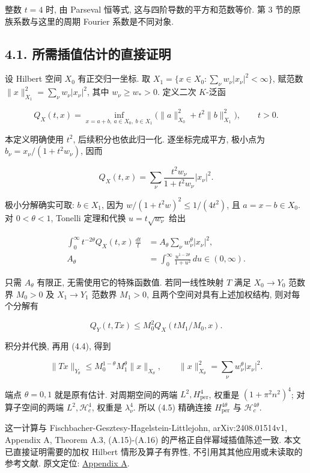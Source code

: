\documentclass[UTF8,fontset=fandol,11pt,a4paper]{ctexart}
\begin{document}
整数 \(t=4\) 时, 由 Parseval 恒等式, 这与四阶导数的平方和范数等价. 第 3 节的原族系数与这里的周期 Fourier 系数是不同对象.


\subsection*{4.1. 所需插值估计的直接证明}

设 Hilbert 空间 \(X_0\) 有正交归一坐标. 取
\(X_1=\{x\in X_0:\sum_\nu w_\nu|x_\nu|^2<\infty\}\),
赋范数 \(\|x\|_{X_1}^2=\sum_\nu w_\nu|x_\nu|^2\), 其中 \(w_\nu\ge w_*>0\).
定义二次 \(K\)-泛函


\[
 Q_X(t,x)=\inf_{x=a+b,\ a\in X_0,\ b\in X_1}
       \bigl(\|a\|_{X_0}^2+t^2\|b\|_{X_1}^2\bigr),\qquad t>0.
 \tag{4.2}
\]


本定义明确使用 \(t^2\), 后续积分也依此归一化. 逐坐标完成平方, 极小点为
\(b_\nu=x_\nu/(1+t^2w_\nu)\), 因而


\[
 Q_X(t,x)=\sum_\nu\frac{t^2w_\nu}{1+t^2w_\nu}|x_\nu|^2.
 \tag{4.3}
\]


极小分解确实可取: \(b\in X_1\), 因为
\(w/(1+t^2w)^2\le1/(4t^2)\), 且 \(a=x-b\in X_0\).
对 \(0<\theta<1\), Tonelli 定理和代换 \(u=t\sqrt{w_\nu}\) 给出


\[
 \begin{split}
 \int_0^\infty t^{-2\theta}Q_X(t,x)\,\frac{dt}{t}
 &=A_\theta\sum_\nu w_\nu^\theta|x_\nu|^2,\\
 A_\theta&=\int_0^\infty\frac{u^{1-2\theta}}{1+u^2}\,du\in(0,\infty).
 \end{split}
 \tag{4.4}
\]


只需 \(A_\theta\) 有限正, 无需使用它的特殊函数值. 若同一线性映射 \(T\) 满足
\(X_0\to Y_0\) 范数界 \(M_0>0\) 及 \(X_1\to Y_1\) 范数界 \(M_1>0\), 且两个空间对具有上述加权结构, 则对每个分解有


\[
 Q_Y(t,Tx)\le M_0^2Q_X(tM_1/M_0,x).
\]


积分并代换, 再用 (4.4), 得到


\[
 \|Tx\|_{Y_\theta}
 \le M_0^{1-\theta}M_1^\theta\|x\|_{X_\theta},
 \qquad
 \|x\|_{X_\theta}^2=\sum_\nu w_\nu^\theta|x_\nu|^2.
 \tag{4.5}
\]


端点 \(\theta=0,1\) 就是原有估计. 对周期空间的两端 \(L^2,H_{\mathrm{per}}^4\), 权重是 \((1+\pi^2n^2)^4\); 对算子空间的两端 \(L^2,\mathcal H_c^4\), 权重是 \(\lambda_\nu^4\). 所以 (4.5) 精确连接 \(H_{\mathrm{per}}^{4\theta}\) 与 \(\mathcal H_c^{4\theta}\).


这一计算与 Fischbacher-Gesztesy-Hagelstein-Littlejohn, arXiv:2408.01514v1, Appendix A, Theorem A.3, (A.15)-(A.16) 的严格正自伴幂域插值陈述一致. 本文已直接证明需要的加权 Hilbert 情形及算子有界性, 不引用其其他应用或未读取的参考文献. 原文定位: \href{https://arxiv.org/html/2408.01514v1\#A1.Thmtheorem3}{Appendix A}.
\end{document}
